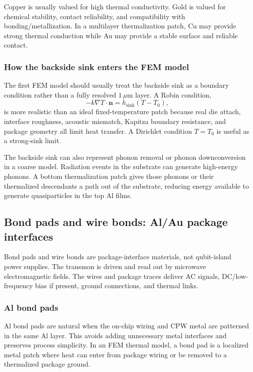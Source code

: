 \documentclass[11pt]{article}
\begin{document}
Copper is usually valued for high thermal conductivity. Gold is valued for chemical stability, contact reliability, and compatibility with bonding/metallization. In a multilayer thermalization patch, Cu may provide strong thermal conduction while Au may provide a stable surface and reliable contact.

\subsubsection{How the backside sink enters the FEM model}
The first FEM model should usually treat the backside sink as a boundary condition rather than a fully resolved $1\,\mu\mathrm{m}$ layer. A Robin condition,
\begin{equation}
    -k\nabla T\cdot\mathbf{n}=h_{\mathrm{sink}}(T-T_0),
\end{equation}
is more realistic than an ideal fixed-temperature patch because real die attach, interface roughness, acoustic mismatch, Kapitza boundary resistance, and package geometry all limit heat transfer. A Dirichlet condition $T=T_0$ is useful as a strong-sink limit.

The backside sink can also represent phonon removal or phonon downconversion in a coarse model. Radiation events in the substrate can generate high-energy phonons. A bottom thermalization patch gives those phonons or their thermalized descendants a path out of the substrate, reducing energy available to generate quasiparticles in the top Al films.

\subsection{Bond pads and wire bonds: Al/Au package interfaces}
Bond pads and wire bonds are package-interface materials, not qubit-island power supplies. The transmon is driven and read out by microwave electromagnetic fields. The wires and package traces deliver AC signals, DC/low-frequency bias if present, ground connections, and thermal links.

\subsubsection{Al bond pads}
Al bond pads are natural when the on-chip wiring and CPW metal are patterned in the same Al layer. This avoids adding unnecessary metal interfaces and preserves process simplicity. In an FEM thermal model, a bond pad is a localized metal patch where heat can enter from package wiring or be removed to a thermalized package ground.
\end{document}
